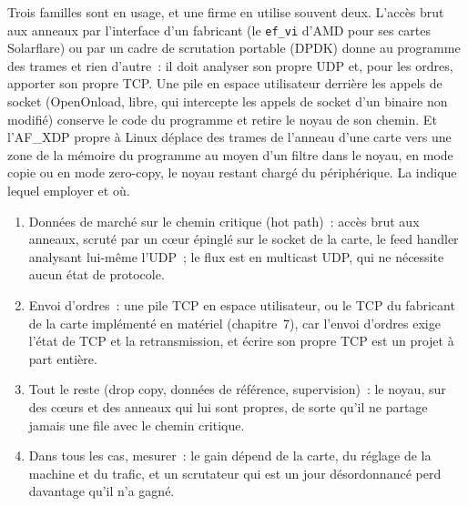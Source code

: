 \begin{remark}\label{rem:nw:network-cards-and-kernel-bypass:families}
Trois familles sont en usage, et une firme en utilise souvent deux. L'accès brut aux anneaux par l'interface d'un fabricant (le \texttt{ef\_vi} d'AMD pour ses
cartes Solarflare) ou par un cadre de scrutation portable (DPDK) donne au programme des trames et rien d'autre~: il doit analyser son propre UDP et,
pour les ordres, apporter son propre TCP. Une pile en espace utilisateur derrière les appels de socket (OpenOnload, libre, qui intercepte les appels de socket
d'un binaire non modifié) conserve le code du programme et retire le noyau de son chemin. Et l'AF\_XDP propre à Linux déplace des trames de
l'anneau d'une carte vers une zone de la mémoire du programme au moyen d'un filtre dans le noyau, en mode copie ou en mode zero-copy, le noyau restant
chargé du périphérique. La  indique lequel employer et où.
\end{remark}

\begin{method}\label{met:nw:network-cards-and-kernel-bypass:choose}
\begin{enumerate}
\item Données de marché sur le chemin critique (hot path)~: accès brut aux anneaux, scruté par un cœur épinglé sur le socket de la carte, le feed handler analysant lui-même l'UDP~; le
  flux est en multicast UDP, qui ne nécessite aucun état de protocole.
\item Envoi d'ordres~: une pile TCP en espace utilisateur, ou le TCP du fabricant de la carte implémenté en matériel (chapitre~7), car l'envoi d'ordres exige l'état de TCP et
  la retransmission, et écrire son propre TCP est un projet à part entière.
\item Tout le reste (drop copy, données de référence, supervision)~: le noyau, sur des cœurs et des anneaux qui lui sont propres, de sorte qu'il ne
  partage jamais une file avec le chemin critique.
\item Dans tous les cas, mesurer~: le gain dépend de la carte, du réglage de la machine et du trafic, et un scrutateur qui est un jour désordonnancé
  perd davantage qu'il n'a gagné.
\end{enumerate}
\end{method}

\label{lst:nw:network-cards-and-kernel-bypass:ring}

